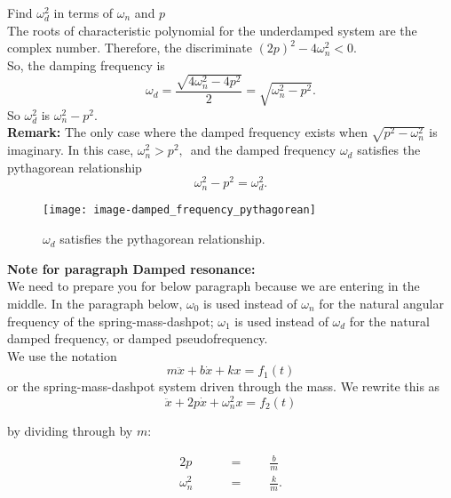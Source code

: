 Find $\omega _ d^2$ in terms of $\omega _ n$ and $p$\\

The roots of characteristic polynomial for the underdamped system are the complex number.
Therefore, the discriminate $(2p)^2 - 4 \omega _ n^2 < 0$. \\
So, the damping frequency is 
\begin{equation*}
  \displaystyle \omega _ d \displaystyle= \frac{\sqrt{4 \omega _ n^2 - 4p^2}}{2}
  \displaystyle= \sqrt{ \omega _ n^2 - p^2}. 
\end{equation*}
So $\omega _ d^2$ is $\omega _ n^2 - p^2$.\\
\clearpage
\textbf{Remark:} The only case where the damped frequency exists when
$\sqrt {p^2-\omega _ n^2}$ is imaginary. In this case,
$\omega _ n^2 > p^2,\,$ and the damped frequency $\omega _d$ satisfies
the pythagorean relationship
\begin{equation*}
  \omega _ n^2 - p^2 = \omega _ d^2.
\end{equation*}

\begin{figure}[ht!]
  \centering
  \texttt{[image: image-damped\_frequency\_pythagorean]}
  \caption{ $\omega _d$ satisfies the pythagorean relationship.}
\end{figure}

\textbf{\color{orange} Note for paragraph Damped resonance:} \\

We need to prepare you for below paragraph because we are entering in the middle.
In the paragraph below, $\omega _0$ is used instead of $\omega _n$
for the natural angular frequency of the spring-mass-dashpot;
$\omega _1$ is used instead of $\omega _d$ for the natural damped frequency,
or damped pseudofrequency. \\

We use the notation
\begin{equation*}
  m\ddot x + b\dot x + kx = f_1(t)
\end{equation*}
or the spring-mass-dashpot system driven through the mass. We rewrite this as
\begin{equation*}
  \ddot x + 2p \dot x + \omega _ n^2 x = f_2(t)
\end{equation*}

by dividing through by $m$:

\begin{align*}
  2p \qquad &= \qquad \frac{b}{m} \, \\
  \omega _n^2 \qquad &= \qquad \frac{k}{m} .
\end{align*}

